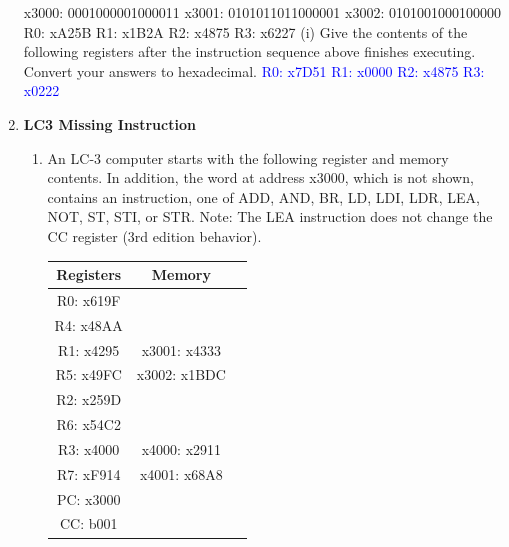 \documentclass{article}
\begin{document}
\begin{enumerate}[label=(\alph*)]
        \newline
        \newline
        x3000: 0001000001000011
        \newline
        x3001: 0101011011000001
        \newline
        x3002: 0101001000100000
        \newline
        R0: xA25B
        R1: x1B2A
        R2: x4875
        R3: x6227
        \newline
        \newline
        (i) Give the contents of the following registers after the instruction sequence above finishes executing. Convert your answers to hexadecimal.
        \textcolor{blue}{
        R0: x7D51
        R1: x0000
        R2: x4875
        R3: x0222}


        \item \textbf{LC3 Missing Instruction}
        \begin{enumerate}[label=(\roman*)]
            \item An LC-3 computer starts with the following register and memory contents. In addition, the word at address x3000, which is not shown, contains an instruction, one of ADD, AND, BR, LD, LDI, LDR, LEA, NOT, ST, STI, or STR. Note: The LEA instruction does not change the CC register (3rd edition behavior).
            \begin{table}[h]
            \centering
            \begin{tabular}{|c|c|c|}
            \hline
            \textbf{Registers} & \textbf{Memory} & \\
            \hline
            R0: x619F & & \\
            \hline
            R4: x48AA & & \\
            \hline
            R1: x4295 & x3001: x4333 & \\
            \hline
            R5: x49FC & x3002: x1BDC & \\
            \hline
            R2: x259D & & \\
            \hline
            R6: x54C2 & & \\
            \hline
            R3: x4000 & x4000: x2911 & \\
            \hline
            R7: xF914 & x4001: x68A8 & \\
            \hline
            PC: x3000 & & \\
            \hline
            CC: b001 & & \\

\end{tabular}
\end{table}
\end{enumerate}
\end{enumerate}
\end{document}
